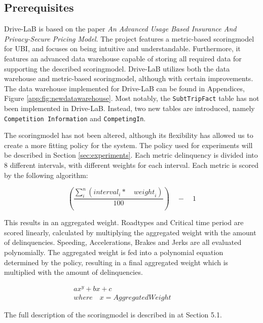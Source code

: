 \subsection{Prerequisites}\label{subsec:prereq}
Drive-LaB is based on the paper \textit{An Advanced Usage Based Insurance And Privacy-Secure Pricing Model}\citep{sw9_report}. The project features a metric-based scoringmodel for UBI, and focuses on being intuitive and understandable. Furthermore, it features an advanced data warehouse capable of storing all required data for supporting the described scoringmodel. Drive-LaB utilizes both the data warehouse and metric-based scoringmodel, although with certain improvements. The data warehouse implemented for Drive-LaB can be found in Appendices, Figure \ref{app:fig:newdatawarehouse}. Most notably, the \texttt{SubtTripFact} table has not been implemented in Drive-LaB. Instead, two new tables are introduced, namely \texttt{Competition Information} and \texttt{CompetingIn}.

The scoringmodel has not been altered, although its flexibility has allowed us to create a more fitting policy for the system. The policy used for experiments will be described in Section \ref{sec:experiments}. Each metric delinquency is divided into 8 different intervals, with different weights for each interval. Each metric is scored by the following algorithm:

$$
\left( \frac { \sum _{ i }^{ n }{ \left( { interval }_{ i }*\quad { weight }_{ i } \right)  }  }{ 100 }  \right) \quad -\quad 1
$$

This results in an aggregated weight. Roadtypes and Critical time period are scored linearly, calculated by multiplying the aggregated weight with the amount of delinquencies. Speeding, Accelerations, Brakes and Jerks are all evaluated polynomially. The aggregated weight is fed into a polynomial equation determined by the policy, resulting in a final aggregated weight which is multiplied with the amount of delinquencies.

\begin{align*}
ax^{y} + bx + c\quad \quad \quad \quad \quad \quad \quad \quad \quad \quad \quad \\
where\quad x = AggregatedWeight
\end{align*}

The full description of the scoringmodel is described in \citep{sw9_report} at Section 5.1.